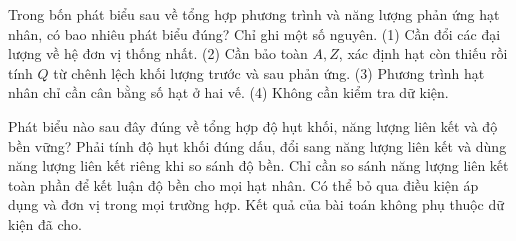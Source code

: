 \begin{ex}
Trong bốn phát biểu sau về tổng hợp phương trình và năng lượng phản ứng hạt nhân, có bao nhiêu phát biểu đúng? Chỉ ghi một số nguyên. (1) Cần đổi các đại lượng về hệ đơn vị thống nhất. (2) Cần bảo toàn $A,Z$, xác định hạt còn thiếu rồi tính $Q$ từ chênh lệch khối lượng trước và sau phản ứng. (3) Phương trình hạt nhân chỉ cần cân bằng số hạt ở hai vế. (4) Không cần kiểm tra dữ kiện.
\end{ex}

\begin{ex}
Phát biểu nào sau đây đúng về tổng hợp độ hụt khối, năng lượng liên kết và độ bền vững?
\choice
{\True Phải tính độ hụt khối đúng dấu, đổi sang năng lượng liên kết và dùng năng lượng liên kết riêng khi so sánh độ bền.}
{Chỉ cần so sánh năng lượng liên kết toàn phần để kết luận độ bền cho mọi hạt nhân.}
{Có thể bỏ qua điều kiện áp dụng và đơn vị trong mọi trường hợp.}
{Kết quả của bài toán không phụ thuộc dữ kiện đã cho.}
\end{ex}

